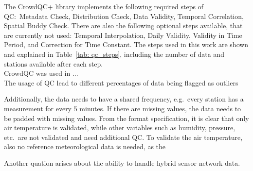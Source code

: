 The CrowdQC+ library implements the following required steps of QC:\ Metadata Check, Distribution Check, Data Validity, Temporal Correlation, Spatial Buddy Check. There are also the following optional steps available, that are currently not used: Temporal Interpolation, Daily Validity, Validity in Time Period, and Correction for Time Constant.
The steps used in this work are shown and explained in Table~\ref{tab: qc_steps}, including the number of data and stations available after each step.\\

CrowdQC was used in ...\\ %
The usage of QC lead to different percentages of data being flagged as outliers

Additionally, the data needs to have a shared frequency, e.g.\ every station has a measurement for every 5 minutes. If there are missing values, the data needs to be padded with missing values. From the format specification, it is clear that only air temperature is validated, while other variables such as humidity, pressure, etc.\ are not validated and need additional QC. To validate the air temperature, also no reference meteorological data is needed, as the 


Another quation arises about the ability to handle hybrid sensor network data.

